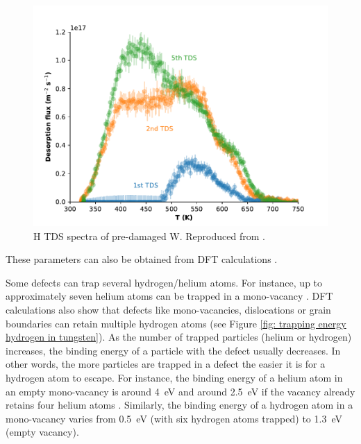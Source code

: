 \begin{figure} [h!]
    \centering
    \includegraphics[width=\linewidth]{Figures/Chapter1/tds_helium_nicolas.pdf}
    \caption{H TDS spectra of pre-damaged W. Reproduced from \cite{ialovega_hydrogen_2020}.}
    \label{fig: TDS example ialovega}
\end{figure}

These parameters can also be obtained from DFT calculations .

Some defects can trap several hydrogen/helium atoms.
For instance, up to approximately seven helium atoms can be trapped in a mono-vacancy .
DFT calculations also show that defects like mono-vacancies, dislocations or grain boundaries can retain multiple hydrogen atoms (see Figure \ref{fig: trapping energy hydrogen in tungsten}).
As the number of trapped particles (helium or hydrogen) increases, the binding energy of a particle with the defect usually decreases.
In other words, the more particles are trapped in a defect the easier it is for a hydrogen atom to escape.
For instance, the binding energy of a helium atom in an empty mono-vacancy is around \SI{4}{eV} and around \SI{2.5}{eV} if the vacancy already retains four helium atoms \cite{faney_spatially_2015}.
Similarly, the binding energy of a hydrogen atom in a mono-vacancy varies from \SI{0.5}{eV} (with six hydrogen atoms trapped) to \SI{1.3}{eV} (empty vacancy).


